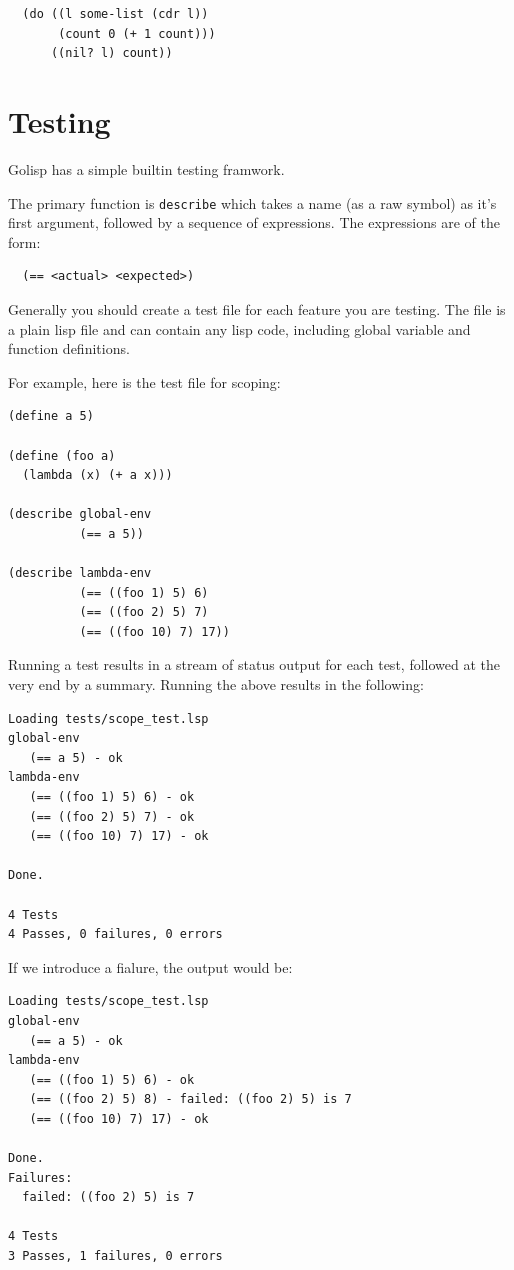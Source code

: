 \documentclass[12pt]{article}
\begin{document}
\begin{verbatim}
  (do ((l some-list (cdr l))
       (count 0 (+ 1 count)))
      ((nil? l) count))
\end{verbatim}

\section{Testing}

Golisp has a simple builtin testing framwork.

The primary function is \verb|describe| which takes a name (as a raw
symbol) as it's first argument, followed by a sequence of expressions.
The expressions are of the form:

\begin{verbatim}
  (== <actual> <expected>)
\end{verbatim}

Generally you should create a test file for each feature you are
testing. The file is a plain lisp file and can contain any lisp code,
including global variable and function definitions.

For example, here is the test file for scoping:

\begin{verbatim}
(define a 5)

(define (foo a)
  (lambda (x) (+ a x)))

(describe global-env
          (== a 5))

(describe lambda-env
          (== ((foo 1) 5) 6)
          (== ((foo 2) 5) 7)
          (== ((foo 10) 7) 17))
\end{verbatim}

Running a test results in a stream of status output for each test,
followed at the very end by a summary.  Running the above results in
the following:

\begin{verbatim}
Loading tests/scope_test.lsp
global-env
   (== a 5) - ok
lambda-env
   (== ((foo 1) 5) 6) - ok
   (== ((foo 2) 5) 7) - ok
   (== ((foo 10) 7) 17) - ok

Done.

4 Tests
4 Passes, 0 failures, 0 errors
\end{verbatim}

If we introduce a fialure, the output would be:

\begin{verbatim}
Loading tests/scope_test.lsp
global-env
   (== a 5) - ok
lambda-env
   (== ((foo 1) 5) 6) - ok
   (== ((foo 2) 5) 8) - failed: ((foo 2) 5) is 7
   (== ((foo 10) 7) 17) - ok

Done.
Failures:
  failed: ((foo 2) 5) is 7

4 Tests
3 Passes, 1 failures, 0 errors
\end{verbatim}
\end{document}
